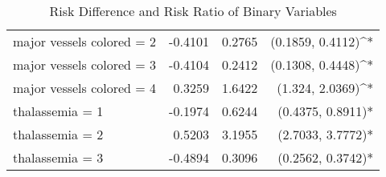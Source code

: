 \begin{table*}[!tp]
{{\begin{tabular}{lrrr}
        major vessels colored = 2         &         -0.4101 &     0.2765 &          (0.1859, 0.4112)^* \\
        major vessels colored = 3         &         -0.4104 &     0.2412 &          (0.1308, 0.4448)^* \\
        major vessels colored = 4         &          0.3259 &     1.6422 &           (1.324, 2.0369)^* \\
        thalassemia = 1                   &         -0.1974 &     0.6244 &          (0.4375, 0.8911)* \\
        thalassemia = 2                   &          0.5203 &     3.1955 &          (2.7033, 3.7772)* \\
        thalassemia = 3                   &         -0.4894 &     0.3096 &          (0.2562, 0.3742)* \\
        \bottomrule
        \end{tabular}
    }}
    \caption{Risk Difference and Risk Ratio of Binary Variables} 
    \label{tab:risk}
\end{table*}